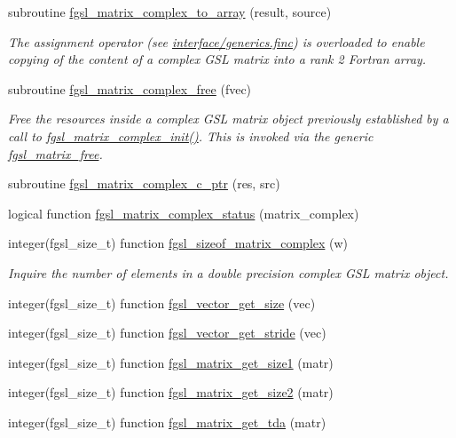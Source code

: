 \begin{DoxyCompactItemize}
subroutine \hyperlink{array_8finc_a4b17724c0c305144fdec66507f8638f7}{fgsl\-\_\-matrix\-\_\-complex\-\_\-to\-\_\-array} (result, source)
\begin{DoxyCompactList}\small\item\em The assignment operator (see \hyperlink{generics_8finc}{interface/generics.\-finc}) is overloaded to enable copying of the content of a complex G\-S\-L matrix into a rank 2 Fortran array. \end{DoxyCompactList}\item 
subroutine \hyperlink{array_8finc_aa26219798c626c7bf6a0a85403f3dbcf}{fgsl\-\_\-matrix\-\_\-complex\-\_\-free} (fvec)
\begin{DoxyCompactList}\small\item\em Free the resources inside a complex G\-S\-L matrix object previously established by a call to \hyperlink{array_8finc_af7461bad6c35fe6dde17e9c06bbc5cd0}{fgsl\-\_\-matrix\-\_\-complex\-\_\-init()}. This is invoked via the generic \hyperlink{interfacefgsl__matrix__free}{fgsl\-\_\-matrix\-\_\-free}. \end{DoxyCompactList}\item 
subroutine \hyperlink{array_8finc_a9f0f952485ef9707174a52c5af21a9a2}{fgsl\-\_\-matrix\-\_\-complex\-\_\-c\-\_\-ptr} (res, src)
\item 
logical function \hyperlink{array_8finc_a3fa8db2b747286e805d60065f6d16640}{fgsl\-\_\-matrix\-\_\-complex\-\_\-status} (matrix\-\_\-complex)
\item 
integer(fgsl\-\_\-size\-\_\-t) function \hyperlink{array_8finc_a14d82675b93fa2b453caf33df1e567a1}{fgsl\-\_\-sizeof\-\_\-matrix\-\_\-complex} (w)
\begin{DoxyCompactList}\small\item\em Inquire the number of elements in a double precision complex G\-S\-L matrix object. \end{DoxyCompactList}\item 
integer(fgsl\-\_\-size\-\_\-t) function \hyperlink{array_8finc_a77255b64802ca66a1ada52fd0a9ceaf6}{fgsl\-\_\-vector\-\_\-get\-\_\-size} (vec)
\item 
integer(fgsl\-\_\-size\-\_\-t) function \hyperlink{array_8finc_adb3b5d4e8f719f06d11479ee5c7ad380}{fgsl\-\_\-vector\-\_\-get\-\_\-stride} (vec)
\item 
integer(fgsl\-\_\-size\-\_\-t) function \hyperlink{array_8finc_a17354bcc1b817f078799391343eee7e4}{fgsl\-\_\-matrix\-\_\-get\-\_\-size1} (matr)
\item 
integer(fgsl\-\_\-size\-\_\-t) function \hyperlink{array_8finc_a14ea1256acfbe059e0ea8e631a470f64}{fgsl\-\_\-matrix\-\_\-get\-\_\-size2} (matr)
\item 
integer(fgsl\-\_\-size\-\_\-t) function \hyperlink{array_8finc_ae49791bd4fbcbd27b90f1cf665fcb008}{fgsl\-\_\-matrix\-\_\-get\-\_\-tda} (matr)
\end{DoxyCompactItemize}


